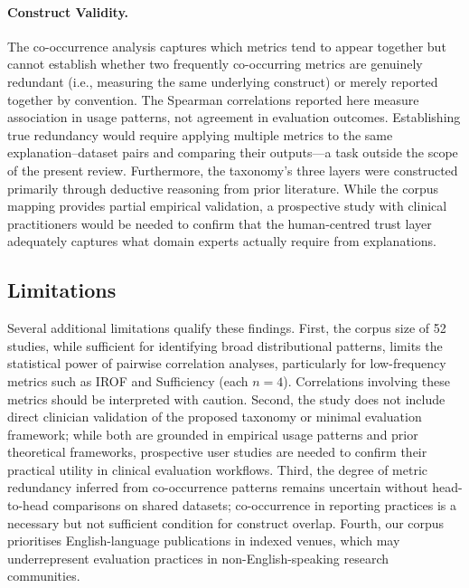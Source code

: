 \paragraph{Construct Validity.}
The co-occurrence analysis captures which metrics tend to appear together
but cannot establish whether two frequently co-occurring metrics are
genuinely redundant (i.e., measuring the same underlying construct) or
merely reported together by convention. The Spearman correlations reported
here measure association in usage patterns, not agreement in evaluation
outcomes. Establishing true redundancy would require applying multiple
metrics to the same explanation--dataset pairs and comparing their
outputs---a task outside the scope of the present review. Furthermore, the
taxonomy's three layers were constructed primarily through deductive reasoning
from prior literature. While the corpus mapping provides partial empirical
validation, a prospective study with clinical practitioners would be needed
to confirm that the human-centred trust layer adequately captures what domain
experts actually require from explanations.

\subsection{Limitations}

Several additional limitations qualify these findings. First, the corpus
size of 52 studies, while sufficient for identifying broad distributional
patterns, limits the statistical power of pairwise correlation analyses,
particularly for low-frequency metrics such as IROF and Sufficiency (each
$n = 4$). Correlations involving these metrics should be interpreted with
caution. Second, the study does not include direct clinician validation of
the proposed taxonomy or minimal evaluation framework; while both are
grounded in empirical usage patterns and prior theoretical frameworks,
prospective user studies are needed to confirm their practical utility in
clinical evaluation workflows. Third, the degree of metric redundancy
inferred from co-occurrence patterns remains uncertain without
head-to-head comparisons on shared datasets; co-occurrence in reporting
practices is a necessary but not sufficient condition for construct overlap.
Fourth, our corpus prioritises English-language publications in indexed
venues, which may underrepresent evaluation practices in non-English-speaking
research communities.

